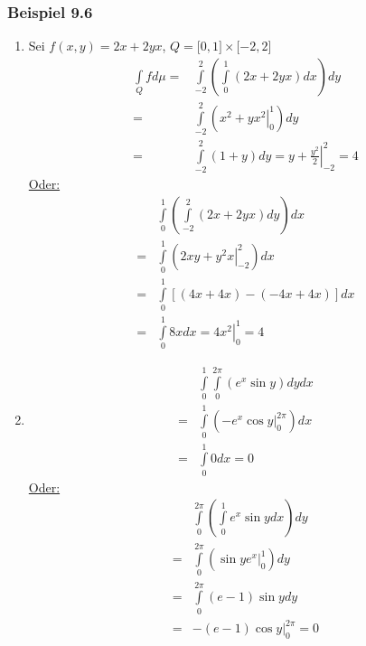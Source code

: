 \subsubsection*{Beispiel 9.6}
\begin{enumerate}
\item Sei $f\left( x,y\right)=2x+2yx$, $Q=\lbrack 0,1\rbrack\times\lbrack -2,2\rbrack$
\begin{align*}
\int\limits_Q {fd\mu }  =&\int\limits_{ - 2}^2 {\left( {\int\limits_0^1 {\left( {2x + 2yx} \right)dx} } \right)dy} \\
=&\int\limits_{ - 2}^2 {\left( {\left. {{x^2} + y{x^2}} \right|_0^1} \right)dy} \\
=&\int\limits_{ - 2}^2 {\left( {1 + y} \right)dy}  = \left. {y + \frac{{{y^2}}}{2}} \right|_{ - 2}^2 = 4
\end{align*}
\underline{Oder:}
\begin{align*}
&\int\limits_0^1 {\left( {\int\limits_{ - 2}^2 {\left( {2x + 2yx} \right)dy} } \right)dx} \\
 =&\int\limits_0^1 {\left( {\left. {2xy + {y^2}x} \right|_{ - 2}^2} \right)dx} \\
 =&\int\limits_0^1 {\left[ {\left( {4x + 4x} \right) - \left( { - 4x + 4x} \right)} \right]dx} \\
 =&\int\limits_0^1 {8xdx}  = \left. {4{x^2}} \right|_0^1 = 4
\end{align*}
\item \begin{align*}
&\int\limits_0^1 {\int\limits_0^{2\pi } {\left( {{e^x}\sin y} \right)dy} dx} \\
=&\int\limits_0^1 {\left( {\left. { - {e^x}\cos y} \right|_0^{2\pi }} \right)dx} \\
=&\int\limits_0^1 0 dx = 0
\end{align*}
\underline{Oder:}
\begin{align*}
&\int\limits_0^{2\pi } {\left( {\int\limits_0^1 {{e^x}\sin ydx} } \right)dy} \\
=&\int\limits_0^{2\pi } {\left( {\left. {\sin y{e^x}} \right|_0^1} \right)dy} \\
=&\int\limits_0^{2\pi } {\left( {e - 1} \right)\sin ydy} \\
=&\left. { - \left( {e - 1} \right)\cos y} \right|_0^{2\pi } = 0
\end{align*}
\end{enumerate}

